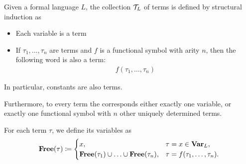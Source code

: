 \begin{definition}\label{def:first_order_terms}\cite[20]{Lectures:logic_programming}
  Given a formal language $L$, the collection $\mathcal T_L$ of terms is defined by structural induction as
  \begin{itemize}
    \item Each variable is a term
    \item If $\tau_1, \ldots, \tau_n$ are terms and $f$ is a functional symbol with arity $n$, then the following word is also a term:
    \begin{align*}
      f(\tau_1, \ldots, \tau_n)
    \end{align*}
  \end{itemize}

  In particular, constants are also terms.

  Furthermore, to every term the corresponds either exactly one variable, or exactly one functional symbol with $n$ other uniquely determined terms.

  For each term $\tau$, we define its variables as
  \begin{align*}
    \operatorname{\mathbf{Free}}(\tau) \coloneqq \begin{cases}
      x,                                                        &\tau = x \in \operatorname{\mathbf{Var}}_L, \\
      \operatorname{\mathbf{Free}}(\tau_1) \cup \ldots \cup \operatorname{\mathbf{Free}}(\tau_n), &\tau = f(\tau_1, \ldots, \tau_n).
    \end{cases}
  \end{align*}
\end{definition}

